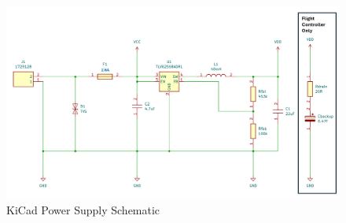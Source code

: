 \begin{figure}[ht]
  \centering
  \includegraphics[width=\textwidth]{figs/Thomas/Custom Hardware/Power Supply.png}
  \caption{KiCad Power Supply Schematic}
  \label{fig:power_supply_schematic}
\end{figure}



